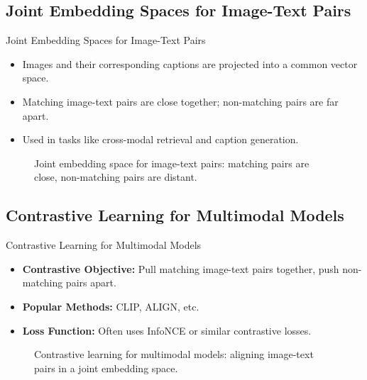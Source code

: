 \subsection{Joint Embedding Spaces for Image-Text Pairs}
\begin{frame}[allowframebreaks]{Joint Embedding Spaces for Image-Text Pairs}
    \begin{itemize}
        \item Images and their corresponding captions are projected into a common vector space.
        \item Matching image-text pairs are close together; non-matching pairs are far apart.
        \item Used in tasks like cross-modal retrieval and caption generation.
    \end{itemize}
\framebreak
    \begin{figure}
        \centering
        \caption*{Joint embedding space for image-text pairs: matching pairs are close, non-matching pairs are distant.}
    \end{figure}
\end{frame}

\subsection{Contrastive Learning for Multimodal Models}
\begin{frame}[allowframebreaks]{Contrastive Learning for Multimodal Models}
    \begin{itemize}
        \item \textbf{Contrastive Objective:} Pull matching image-text pairs together, push non-matching pairs apart.
        \item \textbf{Popular Methods:} CLIP, ALIGN, etc.
        \item \textbf{Loss Function:} Often uses InfoNCE or similar contrastive losses.
    \end{itemize}
\framebreak
    \begin{figure}
        \centering
        \caption*{Contrastive learning for multimodal models: aligning image-text pairs in a joint embedding space.}
    \end{figure}
\end{frame}

